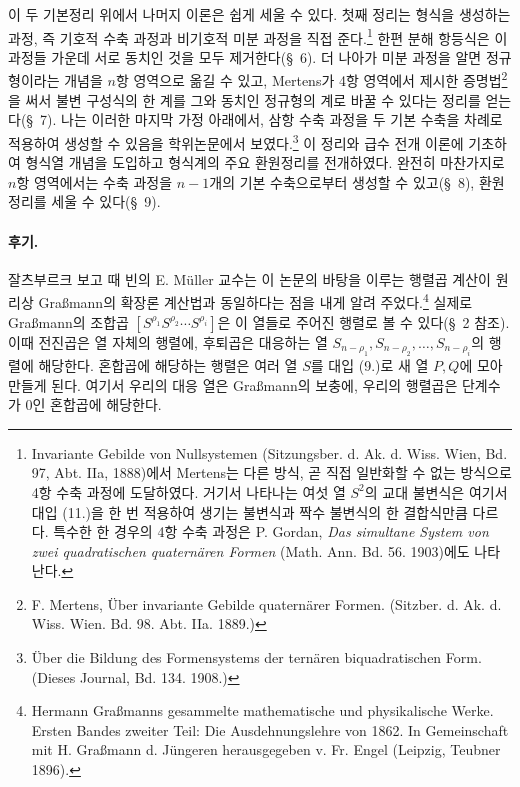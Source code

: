 이 두 기본정리 위에서 나머지 이론은 쉽게 세울 수 있다. 첫째 정리는 형식을 생성하는 과정, 즉 기호적 수축 과정과 비기호적 미분 과정을 직접 준다.\footnote{\glqq{}Invariante Gebilde von Nullsystemen\grqq{} (Sitzungsber. d. Ak. d. Wiss. Wien, Bd. 97, Abt. IIa, 1888)에서 Mertens는 다른 방식, 곧 직접 일반화할 수 없는 방식으로 4항 수축 과정에 도달하였다. 거기서 나타나는 여섯 열 $S^2$의 교대 불변식은 여기서 대입 (11.)을 한 번 적용하여 생기는 불변식과 짝수 불변식의 한 결합식만큼 다르다. 특수한 한 경우의 4항 수축 과정은 P. Gordan, \emph{Das simultane System von zwei quadratischen quaternären Formen} (Math. Ann. Bd. 56. 1903)에도 나타난다.} 한편 분해 항등식은 이 과정들 가운데 서로 동치인 것을 모두 제거한다(\S\ 6). 더 나아가 미분 과정을 알면 \glqq{}정규형\grqq{}이라는 개념을 $n$항 영역으로 옮길 수 있고, Mertens가 4항 영역에서 제시한 증명법\footnote{F. Mertens, Über invariante Gebilde quaternärer Formen. (Sitzber. d. Ak. d. Wiss. Wien. Bd. 98. Abt. IIa. 1889.)}을 써서 불변 구성식의 한 계를 그와 동치인 정규형의 계로 바꿀 수 있다는 정리를 얻는다(\S\ 7). 나는 이러한 마지막 가정 아래에서, 삼항 수축 과정을 두 기본 수축을 차례로 적용하여 생성할 수 있음을 학위논문에서 보였다.\footnote{Über die Bildung des Formensystems der ternären biquadratischen Form. (Dieses Journal, Bd. 134. 1908.)} 이 정리와 급수 전개 이론에 기초하여 \glqq{}형식열\grqq{} 개념을 도입하고 형식계의 주요 환원정리를 전개하였다. 완전히 마찬가지로 $n$항 영역에서는 수축 과정을 $n-1$개의 기본 수축으로부터 생성할 수 있고(\S\ 8), 환원정리를 세울 수 있다(\S\ 9).

\paragraph{후기.} 잘츠부르크 보고 때 빈의 E. Müller 교수는 이 논문의 바탕을 이루는 행렬곱 계산이 원리상 Graßmann의 확장론 계산법과 동일하다는 점을 내게 알려 주었다.\footnote{Hermann Graßmanns gesammelte mathematische und physikalische Werke. Ersten Bandes zweiter Teil: Die Ausdehnungslehre von 1862. In Gemeinschaft mit H. Graßmann d. Jüngeren herausgegeben v. Fr. Engel (Leipzig, Teubner 1896).} 실제로 Graßmann의 \glqq{}조합곱\grqq{} $[S^{\rho_1}S^{\rho_2}\cdots S^{\rho_i}]$은 이 열들로 주어진 행렬로 볼 수 있다(\S\ 2 참조). 이때 \glqq{}전진곱\grqq{}은 열 자체의 행렬에, \glqq{}후퇴곱\grqq{}은 대응하는 열 $S_{n-\rho_1},S_{n-\rho_2},\ldots,S_{n-\rho_i}$의 행렬에 해당한다. \glqq{}혼합곱\grqq{}에 해당하는 행렬은 여러 열 $S$를 대입 (9.)로 새 열 $P,Q$에 모아 만들게 된다. 여기서 우리의 \glqq{}대응 열\grqq{}은 Graßmann의 \glqq{}보충\grqq{}에, 우리의 \glqq{}행렬곱\grqq{}은 \glqq{}단계수가 0인 혼합곱\grqq{}에 해당한다.

